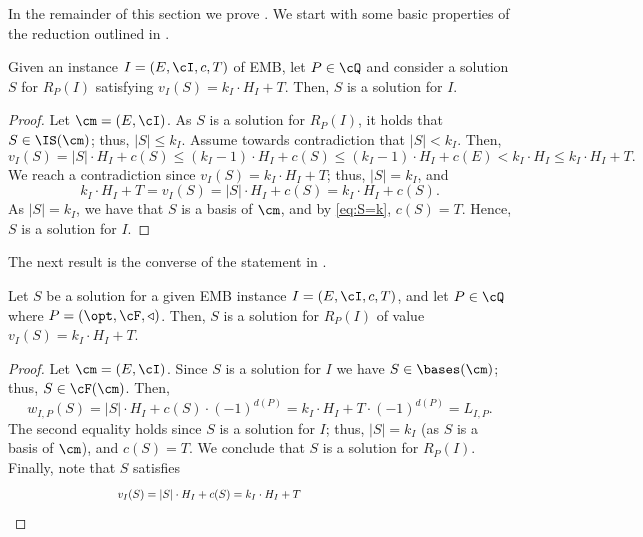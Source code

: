 In the remainder of this section we prove . We start with some basic properties of the reduction outlined in .   

\begin{lemma}
\label{lem:FD2}
Given an instance $I =(E,\cI,c,T)$ of \textnormal{EMB},
let $P \in \cQ$ and consider a solution $S$ for $R_P(I)$ satisfying $v_I(S) = k_I \cdot H_I+T$. Then, $S$ is a solution for $I$.  
\end{lemma}

\begin{proof}
	Let $\cm = (E,\cI)$. As $S$ is a solution for $R_P(I)$, it holds that $S \in \IS(\cm)$; thus, $|S| \leq k_I$. Assume towards contradiction that $|S|<k_I$. Then, 
	$$v_I(S) = |S| \cdot H_I+c(S) \leq (k_I-1) \cdot H_I+c(S) \leq (k_I-1) \cdot H_I+c(E)<k_I \cdot H_I \leq k_I \cdot H_I+T.$$ 
	We reach a contradiction since $v_I(S) = k_I \cdot H_I+T$; thus, $|S| = k_I$, and  
	\begin{equation}
		\label{eq:S=k}
		k_I \cdot H_I+T = v_I(S) =   |S| \cdot H_I+c(S) =  k_I \cdot H_I+c(S). 
	\end{equation}  As $|S| = k_I$, we have that $S$ is a basis of $\cm$, and by \eqref{eq:S=k}, $c(S) = T$. Hence, $S$ is a solution for $I$.   
\end{proof}

The next result is the converse of the statement in .   

	\begin{lemma}
	\label{lem:FD1}
	Let $S$ be a solution for a given \textnormal{EMB} instance $I =(E,\cI,c,T)$,
	and let $P \in \cQ$ where $P = (\opt,\cF,\triangleleft)$. Then, $S$ is a solution for $R_P(I)$ of value $v_I(S) = k_I \cdot H_I+T$.  %
\end{lemma}

\begin{proof}
	Let $\cm = (E,\cI)$. Since $S$ is a solution for $I$ we have $S \in \bases(\cm)$; thus, $S \in \cF(\cm)$. Then,    
	$$w_{I,P}(S) = |S| \cdot H_I+c(S) \cdot (-1)^{d(P)} =  k_I \cdot H_I+T \cdot (-1)^{d(P)} = L_{I,P}.$$
	The second equality holds since $S$ is a solution for $I$; thus, $|S| = k_I$ (as $S$ is a basis of $\cm$), and $c(S) = T$. We conclude that $S$ is a solution for $R_P(I)$. Finally, note that $S$ satisfies 
\begin{align*}
~~~~~~~~~~~~~~~~~~~~~~~~~~~~~	v_I(S) = |S| \cdot H_I + c(S)
	= k_I \cdot H_I +T ~~~~~~~~~~~~~~~~~~~~~~~~~~~~~~~~~~~~~~~~~~~~~~~~~~~~~~~~ \qedhere
\end{align*}
\end{proof}

